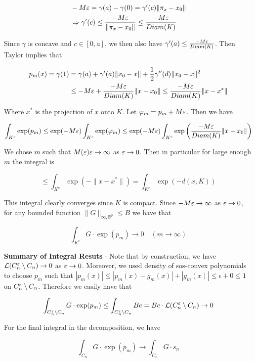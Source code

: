 \documentclass[11pt,reqno]{amsart}
\numberwithin{equation}{section}
\newcommand{\lft}{\left(}
\newcommand{\rt}{\right)}
\newcommand{\mr}{\mathbb{R}}
\newcommand{\tb}{\textbf}
\newcommand{\mc}{\mathcal}
\begin{document}
\begin{align*}
&-M \varepsilon = \gamma(a) - \gamma(0) = \gamma'(c) \|\pi_x - x_0\|\\
&\Rightarrow \gamma'(c) \leq \frac{-M \varepsilon}{\|\pi_x - x_0\|} \leq \frac{-M \varepsilon}{Diam(K)} 
\end{align*}

Since $\gamma$ is concave and $c \in [0,a]$, we then also have $\gamma'(a) \leq \frac{-M \varepsilon}{Diam(K)}$. Then Taylor implies that 

\begin{align*}
p_m(x) = \gamma(1) &= \gamma(a) + \gamma'(a) \|x_0 - x\| + \frac{1}{2} \gamma''(d) \|x_0 - x\|^2\\
&\leq -M \varepsilon + \frac{-M \varepsilon}{Diam(K)} \|x - x_0\| \leq \frac{-M \varepsilon}{Diam(K)} \|x - x^*\|
\end{align*} 

Where $x^*$ is the projection of $x$ onto $K$. Let $\varphi_m = p_m + M \varepsilon $. Then we have 

\begin{align*}
\int_{K^c} \exp(p_m) \leq \exp(-M \eps) \int_{K^c} \exp(\phi_m) \leq \exp(-M \eps) \int_{K^c} \exp \lft \frac{-M \eps}{Diam(K)}\|x - x_0\| \rt 
\end{align*}

We chose $m$ such that $M(\varepsilon) \varepsilon \rightarrow \infty$ as $\varepsilon \rightarrow 0$. Then in particular for large enough $m$ the integral is 

\[
\leq \int_{K^c} \exp \lft -\|x - x^*\| \rt  = \int_{K^c} \exp \lft -d(x,K) \rt 
\]

This integral clearly converges since $K$ is compact. Since $-M \varepsilon \rightarrow \infty$ as $\varepsilon \rightarrow 0$, for any bounded function $\|G\|_{\infty, \mr^p} \leq B$ we have that 

\[
\int_{K^c} G \cdot \exp (p_m)  \to 0 \quad (m \to \infty) 
\]

\tb{Summary of Integral Resuts} - Note that by construction, we have $\mc{L}(C_n^{\eps} \setminus C_n) \to 0$ as $\varepsilon \rightarrow 0$. Moreover, we used density of sos-convex polynomials to choose $p_m$ such that $|p_m(x)| \leq |p_m(x) - g_m(x)| + |g_m(x)| \leq \epsilon + 0 \leq 1$ on $C_n^{\varepsilon} \setminus C_n$. Therefore we easily have that 

\[
\int_{C_n^{\eps} \setminus C_n} G \cdot \exp(p_m) \leq \int_{C_n^{\eps} \setminus C_n} Be = Be \cdot \mc{L}(C_n^{\eps} \setminus C_n) \to 0
\]

For the final integral in the decomposition, we have 

\[
\int_{C_n} G \cdot \exp(p_m) \to \int_{C_n} G \cdot s_n
\]
\end{document}
